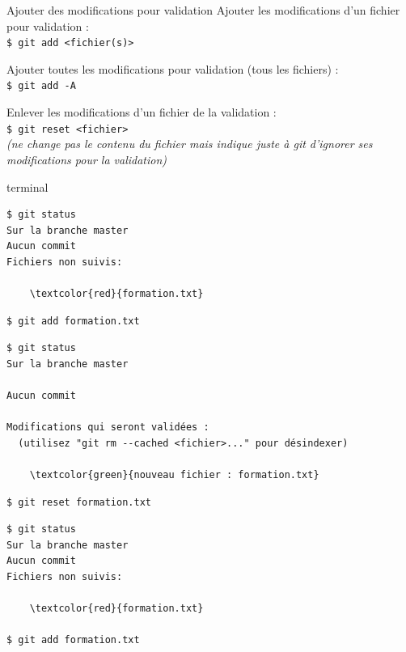 \documentclass[usepdftitle=false]{beamer}
\def\seplength{.3\topsep}
\newcommand{\Pause}{%
\ifdef{\Release}
  {\pause}
  {}
}
\begin{document}
\begin{frame}[fragile]{Ajouter des modifications pour validation}
	Ajouter les modifications d'un fichier pour validation : \\
	\verb+$ git add <fichier(s)>+

	\medskip

	Ajouter toutes les modifications pour validation (tous les fichiers) : \\
	\verb+$ git add -A+

	\medskip

	Enlever les modifications d'un fichier de la validation : \\
	\verb+$ git reset <fichier>+ \\
	{\it (ne change pas le contenu du fichier mais indique juste à git d'ignorer ses modifications pour la validation)}

\end{frame}

\begin{frame}[fragile]
\begin{beamercolorbox}[rounded=true,shadow=true]{terminal}
\vspace{-\seplength}
\begin{Verbatim}
$ git status
Sur la branche master
Aucun commit
Fichiers non suivis:

	\textcolor{red}{formation.txt}
\end{Verbatim}
\Pause
\vspace{-\seplength}
\begin{Verbatim}
$ git add formation.txt
\end{Verbatim}
\Pause
\vspace{-\seplength}
\begin{Verbatim}
$ git status
Sur la branche master

Aucun commit

Modifications qui seront validées :
  (utilisez "git rm --cached <fichier>..." pour désindexer)

	\textcolor{green}{nouveau fichier : formation.txt}
\end{Verbatim}
\Pause
\vspace{-\seplength}
\begin{Verbatim}
$ git reset formation.txt
\end{Verbatim}
\Pause
\vspace{-\seplength}
\begin{Verbatim}
$ git status
Sur la branche master
Aucun commit
Fichiers non suivis:

	\textcolor{red}{formation.txt}

$ git add formation.txt
\end{Verbatim}
\end{beamercolorbox}
\end{frame}
\end{document}

